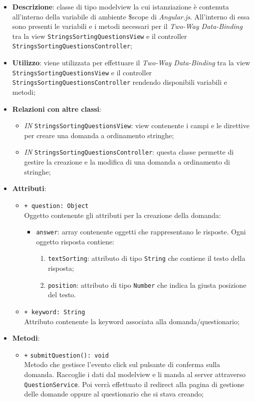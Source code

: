 \begin{itemize}
	\item \textbf{Descrizione}: classe di tipo modelview la cui istanziazione è contenuta all'interno della variabile di ambiente \$scope di \textit{Angular.js}. All'interno di essa sono presenti le variabili e i metodi necessari per il \textit{Two-Way Data-Binding} tra la view \texttt{StringsSortingQuestionsView} e il controller \texttt{StringsSortingQuestionsController}; 
	\item \textbf{Utilizzo}: viene utilizzata per effettuare il \textit{Two-Way Data-Binding} tra la view \texttt{StringsSortingQuestionsView} e il controller \texttt{StringsSortingQuestionsController} rendendo disponibili variabili e metodi;
	\item \textbf{Relazioni con altre classi}:
	\begin{itemize}
		\item \textit{IN} \texttt{StringsSortingQuestionsView}: view contenente i campi e le direttive per creare una domanda a ordinamento stringhe; 
		\item \textit{IN} \texttt{StringsSortingQuestionsController}: questa classe permette di gestire la creazione e la modifica di una domanda a ordinamento di stringhe;
	\end{itemize}
	\item \textbf{Attributi}:
	\begin{itemize}
			\item \texttt{+ question: Object} \\ Oggetto contenente gli attributi per la creazione della domanda:
			\begin{itemize}
				\item \texttt{answer}: array contenente oggetti che rappresentano le risposte. Ogni oggetto risposta contiene:
				\begin{enumerate}
					\item \texttt{textSorting}: attributo di tipo \texttt{String} che contiene il testo della risposta;
					\item \texttt{position}: attributo di tipo \texttt{Number} che indica la giusta posizione del testo.
				\end{enumerate}
			\end{itemize}
			\item \texttt{+ keyword: String} \\ Attributo contenente la keyword associata alla domanda/questionario;	  
	\end{itemize}
	\item \textbf{Metodi}:
	\begin{itemize}
		\item \texttt{+} \texttt{submitQuestion(): void}\\ 
		Metodo che gestisce l’evento click sul pulsante di conferma sulla domanda. Raccoglie i dati dal modelview e li manda al server attraverso \texttt{QuestionService}. Poi verrà effettuato il redirect alla pagina di gestione delle domande oppure al questionario che si stava creando; 
	\end{itemize}
\end{itemize}

